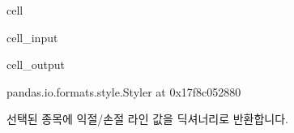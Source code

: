 \documentclass[letterpaper,10pt,english]{jupyterBook}
\begin{document}
\begin{sphinxuseclass}{cell}\begin{sphinxVerbatimInput}

\begin{sphinxuseclass}{cell_input}
\begin{sphinxVerbatim}[commandchars=\\\{\}]
  
\end{sphinxVerbatim}

\end{sphinxuseclass}\end{sphinxVerbatimInput}
\begin{sphinxVerbatimOutput}

\begin{sphinxuseclass}{cell_output}
\begin{sphinxVerbatim}[commandchars=\\\{\}]
\PYGZlt{}pandas.io.formats.style.Styler at 0x17f8c052880\PYGZgt{}
\end{sphinxVerbatim}

\end{sphinxuseclass}\end{sphinxVerbatimOutput}

\end{sphinxuseclass}
\sphinxAtStartPar
 선택된 종목에 익절/손절 라인 값을 딕셔너리로 반환합니다.
\end{document}
